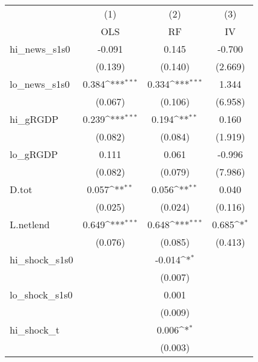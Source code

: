 {
\def\sym#1{\ifmmode^{#1}\else\(^{#1}\)\fi}
\begin{tabular}{l*{3}{c}}
\toprule
            &\multicolumn{1}{c}{(1)}&\multicolumn{1}{c}{(2)}&\multicolumn{1}{c}{(3)}\\
            &\multicolumn{1}{c}{OLS}&\multicolumn{1}{c}{RF}&\multicolumn{1}{c}{IV}\\
\midrule
hi\_news\_s1s0&      -0.091         &       0.145         &      -0.700         \\
            &     (0.139)         &     (0.140)         &     (2.669)         \\
\addlinespace
lo\_news\_s1s0&       0.384\sym{***}&       0.334\sym{***}&       1.344         \\
            &     (0.067)         &     (0.106)         &     (6.958)         \\
\addlinespace
hi\_gRGDP    &       0.239\sym{***}&       0.194\sym{**} &       0.160         \\
            &     (0.082)         &     (0.084)         &     (1.919)         \\
\addlinespace
lo\_gRGDP    &       0.111         &       0.061         &      -0.996         \\
            &     (0.082)         &     (0.079)         &     (7.986)         \\
\addlinespace
D.tot       &       0.057\sym{**} &       0.056\sym{**} &       0.040         \\
            &     (0.025)         &     (0.024)         &     (0.116)         \\
\addlinespace
L.netlend   &       0.649\sym{***}&       0.648\sym{***}&       0.685\sym{*}  \\
            &     (0.076)         &     (0.085)         &     (0.413)         \\
\addlinespace
hi\_shock\_s1s0&                     &      -0.014\sym{*}  &                     \\
            &                     &     (0.007)         &                     \\
\addlinespace
lo\_shock\_s1s0&                     &       0.001         &                     \\
            &                     &     (0.009)         &                     \\
\addlinespace
hi\_shock\_t  &                     &       0.006\sym{*}  &                     \\
            &                     &     (0.003)         &                     \\

\end{tabular}}
